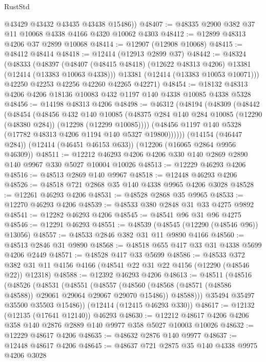 \begin{lexlean}{RustStd}
\begin{coremodule}
        @43429
        @43432
        @43435
        @43438
        @15486))
@48407 := @48335 @2900 @382 @37 @11 @10068 @4338 @4166 @4320 @10062 @4303
@48412 := @12899 @48313 @4206 @37 @2899 @10068
@48414 := @12907 (@12908 @10068)
@48415 := @48412 @48414
@48418 := @12414 (@12913 @2899 @37)
@48442 := @48324
    (@48333
      (@48397
        (@48407 (@48415 @48418) (@12622 @48313 @4206) @13381 (@12414 (@13383 @10063 @4338)))
        @13381
        (@12414 (@13383 @10053 @10071)))
      @42250
      @42253
      @42256
      @42260
      @42265
      @42271)
@48454 := @18132 @48313 @4206 @4206 @18136 @10083 @432 @1197 @140 @4338 @10085 @4338 @5328
@48456 := @14198 @48313 @4206
@48498 := @46312
    (@48194
      (@48309
        (@48442
          (@48454
            (@48456
              @432
              @140
              @10085
              (@48375 @284 @140 @284 @10085 (@12290 (@48380 @284)) (@12298 (@12299 @10085))))
            (@48456 @1197 @140 @5328 (@17782 @48313 @4206 @1194 @140 @5327 @19800))))))
    (@14154 (@46447 @284))
    (@12414 (@46451 @46153 @633))
    (@12206 (@16065 @2864 @9956 @46309))
@48511 := @12212 @46293 @4206 @4206 @330 @140 @2869 @2890 @140 @9967 @330 @5027 @10004 @10026
@48513 := @12229 @46293 @4206
@48516 := @48513 @2869 @140 @9967
@48518 := @12448 @46293 @4206
@48526 := @48518 @721 @2868 @35 @140 @4338 @9965 @4206 @3028
@48528 := @12261 @46293 @4206
@48531 := @48528 @2868 @35 @9965
@48533 := @12270 @46293 @4206
@48539 := @48533 @380 @2848 @31 @33 @4275 @9892
@48541 := @12282 @46293 @4206
@48545 := @48541 @96 @31 @96 @4275
@48546 := @12291 @46293
@48551 := @48539 (@48545 (@12290 (@48546 @96)) @13056)
@48557 := @48533 @2846 @382 @31 @11 @9890 @4166
@48560 := @48513 @2846 @31 @9890
@48568 := @48518 @655 @417 @33 @31 @4338 @5699 @4206 @2449
@48571 := @48528 @417 @33 @5699
@48586 := @48533
    @372
    @382
    @31
    @11
    @4156
    @4166
    (@48541 @22 @31 @22 @4156 (@12290 (@48546 @22)) @12318)
@48588 := @12392 @46293 @4206
@48613 := @48511
    (@48516
      (@48526
        (@48531
          (@48551
            (@48557
              (@48560 (@48568 (@48571 (@48586 @48588)) @29061 @29064 @29067 @29070 @15486))
              @48588)))
        @35494
        @35497
        @35500
        @35503
        @15486))
    (@12414 (@12415 @46293 @330))
@48617 := @12132 (@12135 (@17641 @12140)) @46293
@48630 := @12212 @48617 @4206 @4206 @358 @140 @2876 @2889 @140 @9977 @358 @5027 @10003 @10026
@48632 := @12229 @48617 @4206
@48635 := @48632 @2876 @140 @9977
@48637 := @12448 @48617 @4206
@48645 := @48637 @721 @2875 @35 @140 @4338 @9975 @4206 @3028

\end{coremodule}
\end{lexlean}

